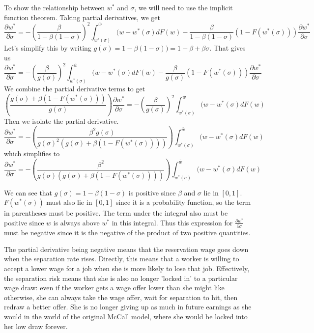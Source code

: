 \documentclass[12pt, letterpaper, parskip = full]{article}
\begin{document}
	\subsubsection{}

	To show the relationship between \(w^*\) and \(\sigma\), we will need to use the implicit function theorem. Taking partial derivatives, we get
	\[ \frac{\partial w^*}{\partial \sigma} = - \left( \frac{\beta}{1 - \beta (1 - \sigma)} \right)^2 \int_{w^*(\sigma)}^{\bar{w}} (w - w^*(\sigma) dF(w) - \frac{\beta}{1 - \beta (1 - \sigma)} (1 - F(w^*(\sigma))) \frac{\partial w^*}{\partial \sigma}  \]
	Let's simplify this by writing \(g(\sigma) = 1 - \beta (1 - \sigma)) = 1 - \beta + \beta \sigma\). That gives us 
	\[ \frac{\partial w^*}{\partial \sigma} = - \left( \frac{\beta}{g(\sigma)} \right)^2 \int_{w^*(\sigma)}^{\bar{w}} (w - w^*(\sigma) dF(w) - \frac{\beta}{g(\sigma)} (1 - F(w^*(\sigma))) \frac{\partial w^*}{\partial \sigma}  \]
	We combine the partial derivative terms to get
	\[ \left( \frac{g(\sigma) + \beta (1 - F(w^*(\sigma)))}{g(\sigma)}     \right) \frac{\partial w^*}{\partial \sigma} = - \left( \frac{\beta}{g(\sigma)} \right)^2 \int_{w^*(\sigma)}^{\bar{w}} (w - w^*(\sigma) dF(w)      \]
	Then we isolate the partial derivative.
	\[ \frac{\partial w^*}{\partial \sigma} = - \left( \frac{\beta^2 g(\sigma)}{g(\sigma)^2 (g(\sigma) + \beta (1 - F(w^*(\sigma))))} \right) \int_{w^*(\sigma)}^{\bar{w}} (w - w^*(\sigma) dF(w)      \]
	which simplifies to 
	\[ \frac{\partial w^*}{\partial \sigma} = - \left( \frac{\beta^2}{g(\sigma) (g(\sigma) + \beta (1 - F(w^*(\sigma))))} \right) \int_{w^*(\sigma)}^{\bar{w}} (w - w^*(\sigma) dF(w)      \]

	We can see that \(g(\sigma) = 1 - \beta (1 - \sigma)\) is positive since \(\beta\) and \(\sigma\) lie in \([0,1]\). \(F(w^*(\sigma))\) must also lie in \([0,1]\) since it is a probability function, so the term in parentheses must be positive. The term under the integral also must be positive since \(w\) is always above \(w^*\) in this integral. Thus this expression for \(\frac{\partial w^*}{\partial \sigma}\) must be negative since it is the negative of the product of two positive quantities. 

	The partial derivative being negative means that the reservation wage goes down when the separation rate rises. Directly, this means that a worker is willing to accept a lower wage for a job when she is more likely to lose that job. Effectively, the separation risk means that she is also no longer 'locked in' to a particular wage draw: even if the worker gets a wage offer lower than she might like otherwise, she can always take the wage offer, wait for separation to hit, then redraw a better offer. She is no longer giving up as much in future earnings as she would in the world of the original McCall model, where she would be locked into her low draw forever. 
	
\end{document}
